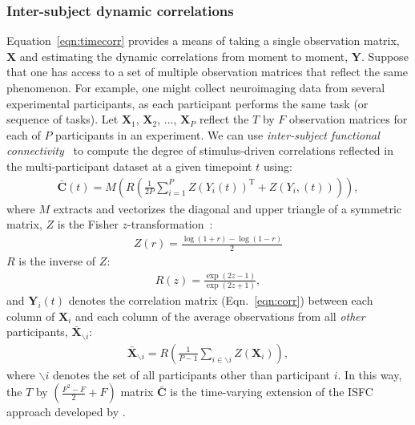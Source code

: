 \documentclass[english]{article}
\begin{document}
\subsubsection*{Inter-subject dynamic correlations}
Equation~\ref{eqn:timecorr} provides a means of taking a single
observation matrix, $\mathbf{X}$ and estimating the dynamic
correlations from moment to moment, $\mathbf{Y}$.  Suppose that one
has access to a set of multiple observation matrices that reflect the
same phenomenon.  For example, one might collect neuroimaging data
from several experimental participants, as each participant performs
the same task (or sequence of tasks).  Let $\mathbf{X}_1$,
$\mathbf{X}_2$, ..., $\mathbf{X}_P$ reflect the $T$ by $F$ observation
matrices for each of $P$ participants in an experiment.  We can use
\textit{inter-subject functional connectivity}~\citep[ISFC;
][]{SimoEtal16} to compute the degree of stimulus-driven correlations
reflected in the multi-participant dataset at a given timepoint $t$
using:
\begin{align}
\bar{\mathbf{C}}(t) = M\left(R\left(\frac{1}{2P} \sum_{i=1}^P
  Z\left(Y_i(t)\right)^\mathrm{T} + Z\left(Y_i,(t)\right)\right)\right),
\end{align}
where $M$ extracts and vectorizes the diagonal and upper triangle of a symmetric
matrix, $Z$ is the Fisher $z$-transformation~\citep{Zar10}:
\begin{align}
Z(r) = \frac{\log(1+r) - \log(1-r)}{2}
\end{align}
$R$ is the inverse of $Z$:
\begin{align}
R(z) = \frac{\exp(2z - 1)}{\exp(2z + 1)},
\end{align}
and $\mathbf{Y}_i(t)$ denotes the correlation matrix
(Eqn.~\ref{eqn:corr}) between each column of $\mathbf{X}_i$ and each
column of the average observations from all \textit{other}
participants, $\bar{\mathbf{X}}_{ \backslash i}$:
\begin{align}
  \bar{\mathbf{X}}_{ \backslash i} = R\left(\frac{1}{P-1}\sum_{i \in
  \backslash i} Z\left( \mathbf{X}_i \right) \right),
\end{align}
where $ \backslash i$ denotes the set of all participants other than
participant $i$. In this way, the $T$ by $\left( \frac{F^2 - F}{2}
  + F \right)$
matrix $\bar{\mathbf{C}}$ is the time-varying extension of the ISFC
approach developed by \cite{SimoEtal16}.
\end{document}
